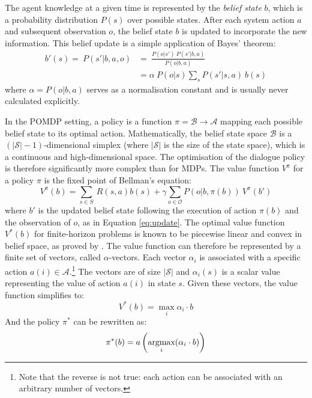 The agent knowledge at a given time is represented by the \textit{belief state} $b$, which is a probability distribution $P(s)$ over possible states.  After each system action $a$ and subsequent observation $o$, the belief state $b$ is updated to incorporate the new information.  This belief update is a simple application of Bayes' theorem: 
\begin{align}
b'(s) = \ \!P(s'|b, a,o) & = \ \frac{P(o|s') \ P(s'|b,a)}{P(o|b,a)} \\[3mm]
& = \alpha \ P(o|s) \sum_{s} P(s'|s,a) \ b(s) \label{eq:update}
\end{align}
where $\alpha = P(o|b,a)$ serves as a normalisation constant and is usually never calculated explicitly. 

In the POMDP setting, a policy is a function $\pi = \mathcal{B} \rightarrow \mathcal{A}$ mapping each possible belief state to its optimal action.  Mathematically, the belief state space $\mathcal{B}$ is a $(|\mathcal{S}|\!-\!1)$-dimensional simplex (where $|\mathcal{S}|$ is the size of the state space), which is a continuous and high-dimensional space. The optimisation of the dialogue policy is therefore significantly more complex than for MDPs. The value function $V^{\pi}$ for a policy $\pi$ is the fixed point of Bellman's equation: 
\begin{equation}
V^{\pi}(b) = \sum_{s \in S} \ R(s,a) b(s) + \gamma \sum_{o \in \mathcal{O}} P(o|b,\pi(b)) \ V^{\pi}(b')
\end{equation}
where $b'$ is the updated belief state following the execution of action $\pi(b)$ and the observation of $o$, as in Equation \eqref{eq:update}.  The optimal value function $V^*(b)$ for finite-horizon problems is known to be piecewise linear and convex in belief space, as proved by \cite{Sondik1971}. The value function can therefore be represented by a finite set of vectors, called $\alpha$-vectors. Each vector $\alpha_i$ is associated with a specific action $a(i) \in \mathcal{A}$.\footnote{Note that the reverse is not true: each action can be associated with an arbitrary number of vectors.}  The vectors are of size $|\mathcal{S}|$ and $\alpha_i(s)$ is a scalar value representing the value of action $a(i)$ in state $s$.  Given these vectors, the value function simplifies to:
\begin{equation}
V^*(b) = \max_{i} \alpha_i \cdot b
\end{equation}
And the policy $\pi^*$ can be rewritten as:
\begin{equation}
\pi^*(b) = a\left(\argmax_i(\alpha_i \cdot b)\right)
\end{equation}

